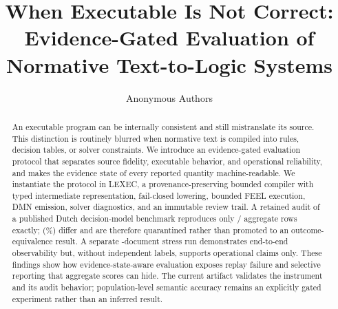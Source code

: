 \documentclass{article}
\title{When Executable Is Not Correct:\\Evidence-Gated Evaluation of Normative Text-to-Logic Systems}
\author{Anonymous Authors}
\newcommand{\lexec}{LEXEC}
\begin{document}


\maketitle

\begin{abstract}
An executable program can be internally consistent and still mistranslate its
source.  This distinction is routinely blurred when normative text is compiled
into rules, decision tables, or solver constraints.  We introduce an
evidence-gated evaluation protocol that separates source fidelity, executable
behavior, and operational reliability, and makes the evidence state of every
reported quantity machine-readable.  We instantiate the protocol in \lexec{},
a provenance-preserving bounded compiler with typed intermediate
representation, fail-closed lowering, bounded FEEL execution, DMN emission,
solver diagnostics, and an immutable review trail.  A retained audit of a
published Dutch decision-model benchmark reproduces only
\ReplayExactRows{}/\ReplayRows{} aggregate rows exactly; \ReplayMismatchRows{}
(\ReplayMismatchPercent{}\%) differ and are therefore quarantined rather than
promoted to an outcome-equivalence result.  A separate
\PrivacyFiles{}-document stress run demonstrates end-to-end observability but,
without independent labels, supports operational claims only.  These findings
show how evidence-state-aware evaluation exposes replay failure and selective
reporting that aggregate scores can hide.  The current artifact validates the
instrument and its audit behavior; population-level semantic accuracy remains
an explicitly gated experiment rather than an inferred result.
\end{abstract}











{\small


}

\appendix




\end{document}
